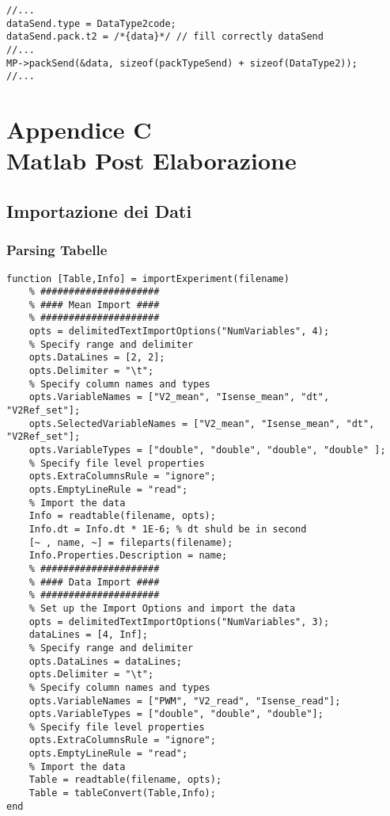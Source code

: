 \begin{lstlisting}[style=cppStyle,caption={Definizione Pacchetti Multipli},label=lst:EMPsendOptimize] 
//...
dataSend.type = DataType2code;
dataSend.pack.t2 = /*{data}*/ // fill correctly dataSend
//...    
MP->packSend(&data, sizeof(packTypeSend) + sizeof(DataType2));
//...
\end{lstlisting}


\chapter*{Appendice C\\ Matlab Post Elaborazione}\label{MatlabCode}
\setcounter{chapter}{\thechapter + 1}

\section{Importazione dei Dati}
\subsection{Parsing Tabelle} \label{subsec:tabParsing}
\begin{lstlisting}[style=matlabStyle,caption={Parsing delle tabelle},label=lst:tabParsing] 
function [Table,Info] = importExperiment(filename)
	% #####################
	% #### Mean Import ####
	% #####################
	opts = delimitedTextImportOptions("NumVariables", 4);
	% Specify range and delimiter
	opts.DataLines = [2, 2];
	opts.Delimiter = "\t";
	% Specify column names and types
	opts.VariableNames = ["V2_mean", "Isense_mean", "dt", "V2Ref_set"];
	opts.SelectedVariableNames = ["V2_mean", "Isense_mean", "dt", "V2Ref_set"];
	opts.VariableTypes = ["double", "double", "double", "double" ];
	% Specify file level properties
	opts.ExtraColumnsRule = "ignore";
	opts.EmptyLineRule = "read";	
	% Import the data
	Info = readtable(filename, opts);
	Info.dt = Info.dt * 1E-6; % dt shuld be in second
	[~ , name, ~] = fileparts(filename);
	Info.Properties.Description = name;	
	% #####################
	% #### Data Import ####
	% #####################
	% Set up the Import Options and import the data
	opts = delimitedTextImportOptions("NumVariables", 3);
	dataLines = [4, Inf];
	% Specify range and delimiter
	opts.DataLines = dataLines;
	opts.Delimiter = "\t";
	% Specify column names and types
	opts.VariableNames = ["PWM", "V2_read", "Isense_read"];
	opts.VariableTypes = ["double", "double", "double"];
	% Specify file level properties
	opts.ExtraColumnsRule = "ignore";
	opts.EmptyLineRule = "read";
	% Import the data
	Table = readtable(filename, opts);
	Table = tableConvert(Table,Info);
end
\end{lstlisting}
\newpage
